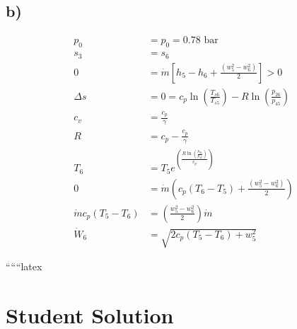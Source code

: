 

\subsection*{b)}

\begin{align*}
    p_0 &= p_0 = 0.78 \text{ bar} \\
    s_3 &= s_6 \\
    0 &= \dot{m} \left[ h_5 - h_6 + \frac{(w_5^2 - w_6^2)}{2} \right] > 0 \\
    \Delta s &= 0 = c_p \ln \left( \frac{T_{s6}}{T_{s5}} \right) - R \ln \left( \frac{p_{26}}{p_{45}} \right) \\
    c_v &= \frac{c_p}{\gamma} \\
    R &= c_p - \frac{c_p}{\gamma} \\
    T_6 &= T_5 e^{\left( \frac{R \ln \left( \frac{p_{06}}{p_{45}} \right)}{c_p} \right)} \\
    0 &= \dot{m} \left( c_p (T_6 - T_5) + \frac{(w_5^2 - w_6^2)}{2} \right) \\
    \dot{m} c_p (T_5 - T_6) &= \left( \frac{w_5^2 - w_6^2}{2} \right) \dot{m} \\
    \dot{W}_6 &= \sqrt{2 c_p (T_5 - T_6) + w_5^2}
\end{align*}

``````latex

\section*{Student Solution}